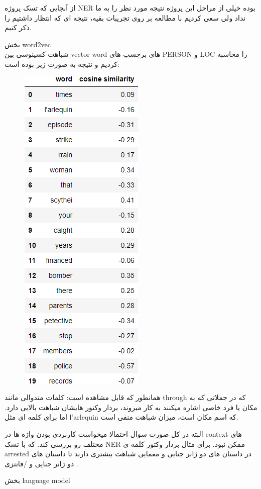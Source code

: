 از آنجایی که تسک پروژه NER بوده خیلی از مراحل این پروژه نتیجه مورد نظر را به ما نداد ولی سعی کردیم با مطالعه بر روی تجریبات بقیه، نتیجه ای که انتظار داشتیم را ذکر کنیم.

\huge
\LARGE{بخش word2vec}\\
\large
شباهت کسینوسی بین
vector word
های برچسب های
PERSON و LOC
را محاسبه کردیم و نتیجه به صورت زیر بوده است:
\begin{figure}[H]
    \centering
    \includegraphics[width=0.4\linewidth]{../reports/word2vec_cosine_similarity.png}
   \end{figure}
   
همانطور که قابل مشاهده است: 
کلمات متدوالی مانند 
through
که در جملاتی که به مکان یا فرد خاصی اشاره میکنند به کار میروند، بردار وکتور هایشان شباهت بالایی دارد.
اما برای کلمه ای مثل l'arlequin
که اسم مکان است، میزان شباهت منفی است.

البته در کل صورت سوال احتمالا میخواست کاربردی بودن واژه ها در context های مختلف رو بررسی کند.
که با تسک NER ممکن نبود.
برای مثال بردار وکتور کلمه ی arrested
در داستان های دو ژانر جنایی و معمایی شباهت بیشتری دارند تا داستان های دو ژانر جنایی و /فانتزی
.

\huge
\LARGE{بخش language model}
\large

